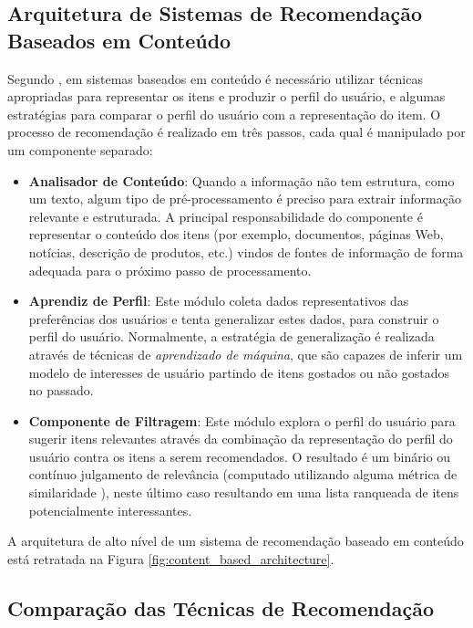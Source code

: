 \subsection{Arquitetura de Sistemas de Recomendação Baseados em Conteúdo}

Segundo \cite{lops2011ContentBased}, em sistemas baseados em conteúdo é necessário utilizar técnicas apropriadas para representar os itens e produzir o perfil do usuário, e algumas estratégias para comparar o perfil do usuário com a representação do item. O processo de recomendação é realizado em três passos, cada qual é manipulado por um componente separado:

\begin{itemize}
	\item{\textbf{Analisador de Conteúdo}: Quando a informação não tem estrutura, como um texto, algum tipo de pré-processamento é preciso para extrair informação relevante e estruturada. A principal responsabilidade do componente é representar o conteúdo dos itens (por exemplo, documentos, páginas Web, notícias, descrição de produtos, etc.) vindos de fontes de informação de forma adequada para o próximo passo de processamento.}
	
	\item{\textbf{Aprendiz de Perfil}: Este módulo coleta dados representativos das preferências dos usuários e tenta generalizar estes dados, para construir o perfil do usuário. Normalmente, a estratégia de generalização é realizada através de técnicas de \textit{aprendizado de máquina}, que são capazes de inferir um modelo de interesses de usuário partindo de itens gostados ou não gostados no passado.}
	
	\item{\textbf{Componente de Filtragem}: Este módulo explora o perfil do usuário para sugerir itens relevantes através da combinação da representação do perfil do usuário contra os itens a serem recomendados. O resultado é um binário ou contínuo julgamento de relevância (computado utilizando alguma métrica de similaridade \citep{Herlocker:2004:ECF:963770.963772}), neste último caso resultando em uma lista ranqueada de itens potencialmente interessantes.}
\end{itemize}

A arquitetura de alto nível de um sistema de recomendação baseado em conteúdo está retratada na Figura \ref{fig:content_based_architecture}.


\subsection{Comparação das Técnicas de Recomendação}

